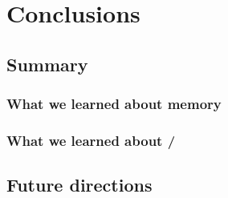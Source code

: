\acresetall
\chapter{Conclusions}
\label{ch:conclusions}
\section{Summary}


\subsection{What we learned about memory}

\subsection{What we learned about \scz/}

\section{Future directions}